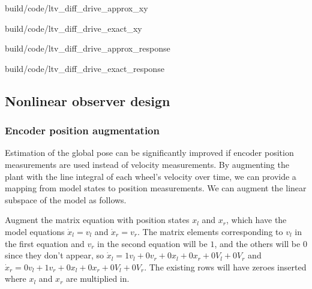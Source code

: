 \begin{bookfigure}
  \begin{minisvg}{2}{build/code/ltv_diff_drive_approx_xy}
    \caption{Linear time-varying differential drive controller x-y plot
      (approximate)}
    \label{fig:ltv_diff_drive_approx_xy}
  \end{minisvg}
  \hfill
  \begin{minisvg}{2}{build/code/ltv_diff_drive_exact_xy}
    \caption{Linear time-varying differential drive controller x-y plot (exact)}
  \end{minisvg}
  \hfill
  \begin{minisvg}{2}{build/code/ltv_diff_drive_approx_response}
    \caption{Linear time-varying differential drive controller response
      (approximate)}
  \end{minisvg}
  \hfill
  \begin{minisvg}{2}{build/code/ltv_diff_drive_exact_response}
    \caption{Linear time-varying differential drive controller response (exact)}
    \label{fig:ltv_diff_drive_exact_response2}
  \end{minisvg}
\end{bookfigure}

\subsection{Nonlinear observer design}

\subsubsection{Encoder position augmentation}

Estimation of the global pose can be significantly improved if encoder position
measurements are used instead of velocity measurements. By augmenting the plant
with the line integral of each wheel's velocity over time, we can provide a
mapping from model states to position measurements. We can augment the linear
subspace of the model as follows.

Augment the matrix equation with position states $x_l$ and $x_r$, which have the
model equations $\dot{x}_l = v_l$ and $\dot{x}_r = v_r$. The matrix elements
corresponding to $v_l$ in the first equation and $v_r$ in the second equation
will be $1$, and the others will be $0$ since they don't appear, so
$\dot{x}_l = 1v_l + 0v_r + 0x_l + 0x_r + 0V_l + 0V_r$ and
$\dot{x}_r = 0v_l + 1v_r + 0x_l + 0x_r + 0V_l + 0V_r$. The existing rows will
have zeroes inserted where $x_l$ and $x_r$ are multiplied in.

